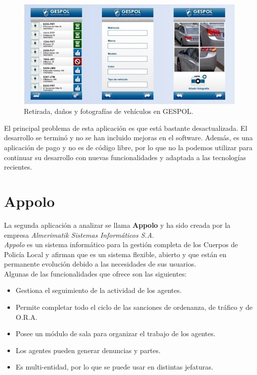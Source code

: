 \begin{figure}[H]
	\centering
	\includegraphics[scale=0.75]{imagenes/gespol1.jpg}
	\caption{Retirada, daños y fotografías de vehículos en GESPOL.\cite{gespol} \label{fig:figura17}}
\end{figure}

El principal problema de esta aplicación es que está bastante desactualizada. El desarrollo se terminó y no se han incluido mejoras en el software. Además,
es una aplicación de pago y no es de código libre, por lo que no la podemos utilizar para continuar su desarrollo con nuevas funcionalidades y adaptada a las tecnologías recientes.

\section{Appolo}
La segunda aplicación a analizar se llama \textbf{Appolo} y ha sido creada por la empresa \textit{Almerimatik Sistemas Informáticos S.A}. \\

\textit{Appolo} es un sistema informático para la gestión completa de los Cuerpos de Policía Local y afirman que es un sistema
flexible, abierto y que están en permanente evolución debido a las necesidades de sus usuarios.\\

Algunas de las funcionalidades que ofrece son las siguientes:
\begin{itemize}
	\item Gestiona el seguimiento de la actividad de los agentes.
	\item Permite completar todo el ciclo de las sanciones de ordenanza, de tráfico y de O.R.A. 
	\item Posee un módulo de sala para organizar el trabajo de los agentes.
	\item Los agentes pueden generar denuncias y partes.
	\item Es multi-entidad, por lo que se puede usar en distintas jefaturas.
\end{itemize}

